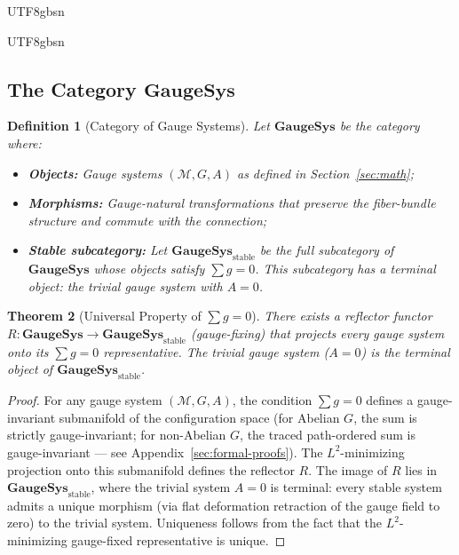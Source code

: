 \documentclass[11pt,a4paper]{article}
\newtheorem{theorem}{Theorem}[section]
\newtheorem{definition}[theorem]{Definition}
\newcommand{\Manifold}{\mathcal{M}}
\begin{document}
\begin{CJK}{UTF8}{gbsn}
{\begin{CJK}{UTF8}{gbsn}
\subsection{The Category $\mathbf{GaugeSys}$}
\begin{definition}[Category of Gauge Systems]
Let $\mathbf{GaugeSys}$ be the category where:
\begin{itemize}
    \item \textbf{Objects:} Gauge systems $(\Manifold, G, A)$ as defined in
          Section~\ref{sec:math};
    \item \textbf{Morphisms:} Gauge-natural transformations that preserve the
          fiber-bundle structure and commute with the connection;
    \item \textbf{Stable subcategory:} Let $\mathbf{GaugeSys}_{\text{stable}}$ be the
          full subcategory of $\mathbf{GaugeSys}$ whose objects satisfy $\sum g = 0$.
          This subcategory has a terminal object: the trivial gauge system with $A = 0$.
\end{itemize}
\end{definition}
\begin{theorem}[Universal Property of $\sum g = 0$]
\label{thm:universal-prop}
There exists a reflector functor $R: \mathbf{GaugeSys} \to \mathbf{GaugeSys}_{\text{stable}}$
(gauge-fixing) that projects every gauge system onto its $\sum g = 0$ representative.
The trivial gauge system ($A=0$) is the terminal object of $\mathbf{GaugeSys}_{\text{stable}}$.
\end{theorem}
\begin{proof}
For any gauge system $(\Manifold, G, A)$, the condition $\sum g = 0$ defines a
gauge-invariant submanifold of the configuration space (for Abelian $G$, the sum
is strictly gauge-invariant; for non-Abelian $G$, the traced path-ordered sum is
gauge-invariant --- see Appendix~\ref{sec:formal-proofs}). The $L^2$-minimizing
projection onto this submanifold defines the reflector $R$. The image of $R$ lies in
$\mathbf{GaugeSys}_{\text{stable}}$, where the trivial system $A=0$ is terminal: every
stable system admits a unique morphism (via flat deformation retraction of the gauge
field to zero) to the trivial system. Uniqueness follows from the fact that the
$L^2$-minimizing gauge-fixed representative is unique.
\end{proof}

\end{CJK}}
\end{CJK}
\end{document}
